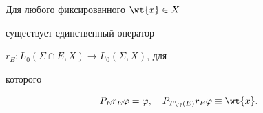 




\begin{thm}


Для любого фиксированного $\wt{x}\in X$


существует единственный оператор


$r_E:L_0(\Sigma\cap E,X)\to L_0(\Sigma ,X)$, для


которого


\begin{equation}


\label{2}


P_Er_E\f=\f, \quad P_{T\setminus\gamma(E)}r_E\f\equiv\wt{x}.


\end{equation}


\end{thm}






